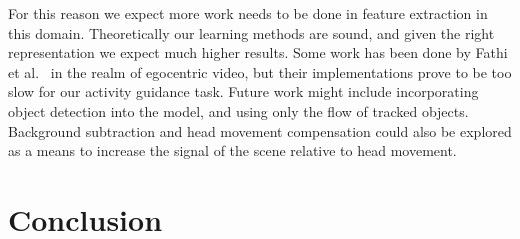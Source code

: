 \documentclass[10pt,twocolumn,letterpaper]{article}
\begin{document}
For this reason we expect more work needs to be done in feature extraction in this domain. Theoretically our learning methods are sound, and given the right representation we expect much higher results. Some work has been done by Fathi et al.~\cite{fathi2011understanding} in the realm of egocentric video, but their implementations prove to be too slow for our activity guidance task. Future work might include incorporating object detection into the model, and using only the flow of tracked objects. Background subtraction and head movement compensation could also be explored as a means to increase the signal of the scene relative to head movement.
 
\section{Conclusion}



{\small


}
\end{document}
